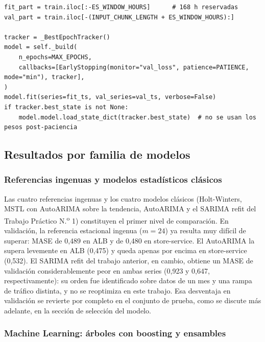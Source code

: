 \begin{lstlisting}[caption={Ajuste con ventana libre de fuga de información y restitución de la mejor época (\texttt{tsa\_final/dl\_models.py}).}, label=cod:early_stopping]
fit_part = train.iloc[:-ES_WINDOW_HOURS]      # 168 h reservadas
val_part = train.iloc[-(INPUT_CHUNK_LENGTH + ES_WINDOW_HOURS):]

tracker = _BestEpochTracker()
model = self._build(
    n_epochs=MAX_EPOCHS,
    callbacks=[EarlyStopping(monitor="val_loss", patience=PATIENCE, mode="min"), tracker],
)
model.fit(series=fit_ts, val_series=val_ts, verbose=False)
if tracker.best_state is not None:
    model.model.load_state_dict(tracker.best_state)  # no se usan los pesos post-paciencia
\end{lstlisting}

\subsection{Resultados por familia de modelos}

\subsubsection{Referencias ingenuas y modelos estadísticos clásicos}

Las cuatro referencias ingenuas y los cuatro modelos clásicos (Holt-Winters, MSTL con AutoARIMA sobre la
tendencia, AutoARIMA y el SARIMA refit del Trabajo Práctico N.\textsuperscript{o} 1) constituyen el primer
nivel de comparación. En validación, la referencia estacional ingenua ($m=24$) ya resulta muy difícil de
superar: MASE de 0,489 en ALB y de 0,480 en store-service. El AutoARIMA la supera levemente en ALB (0,475)
y queda apenas por encima en store-service (0,532). El SARIMA refit del trabajo anterior, en cambio,
obtiene un MASE de validación considerablemente peor en ambas series (0,923 y 0,647, respectivamente): su
orden fue identificado sobre datos de un mes y una rampa de tráfico distinta, y no se reoptimiza en este
trabajo. Esa desventaja en validación se revierte por completo en el conjunto de prueba, como se discute
más adelante, en la sección de selección del modelo.

\subsubsection{Machine Learning: árboles con boosting y ensambles}
\label{sec:ml}

